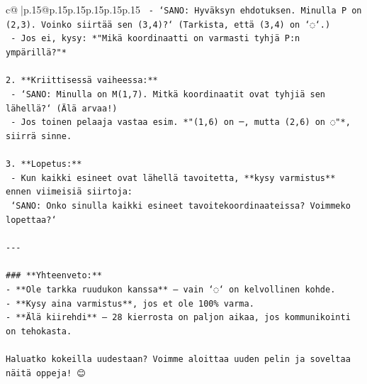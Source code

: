 \documentclass{article}
\begin{document}
{\begin{supertabular}{c@{$\;$}|p{.15\linewidth}@{}p{.15\linewidth}p{.15\linewidth}p{.15\linewidth}p{.15\linewidth}p{.15\linewidth}}
{{{\texttt{   {-} `SANO: Hyväksyn ehdotuksen. Minulla P on (2,3). Voinko siirtää sen (3,4)?` (Tarkista, että (3,4) on `◌`.)} \\
\texttt{   {-} Jos ei, kysy: *"Mikä koordinaatti on varmasti tyhjä P:n ympärillä?"*} \\
\\ 
\texttt{2. **Kriittisessä vaiheessa:**} \\
\texttt{   {-} `SANO: Minulla on M(1,7). Mitkä koordinaatit ovat tyhjiä sen lähellä?` (Älä arvaa!)} \\
\texttt{   {-} Jos toinen pelaaja vastaa esim. *"(1,6) on ─, mutta (2,6) on ◌"*, siirrä sinne.} \\
\\ 
\texttt{3. **Lopetus:**} \\
\texttt{   {-} Kun kaikki esineet ovat lähellä tavoitetta, **kysy varmistus** ennen viimeisiä siirtoja:} \\
\texttt{     `SANO: Onko sinulla kaikki esineet tavoitekoordinaateissa? Voimmeko lopettaa?`} \\
\\ 
\texttt{{-}{-}{-}} \\
\\ 
\texttt{\#\#\# **Yhteenveto:**} \\
\texttt{{-} **Ole tarkka ruudukon kanssa** – vain `◌` on kelvollinen kohde.} \\
\texttt{{-} **Kysy aina varmistus**, jos et ole 100\% varma.} \\
\texttt{{-} **Älä kiirehdi** – 28 kierrosta on paljon aikaa, jos kommunikointi on tehokasta.} \\
\\ 
\texttt{Haluatko kokeilla uudestaan? Voimme aloittaa uuden pelin ja soveltaa näitä oppeja! 😊} \\
            }
        }
    }
     \\ \\


\end{supertabular}}
\end{document}
